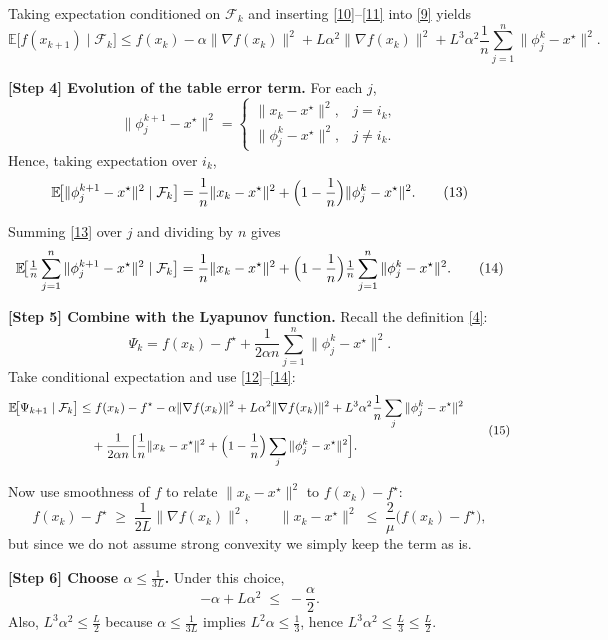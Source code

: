\documentclass{article}
\newcommand{\EE}{\mathbb{E}}
\begin{document}
Taking expectation conditioned on $\mathcal{F}_k$ and inserting \eqref{10}–\eqref{11} into \eqref{9} yields
\[
\EE\!\bigl[f(x_{k+1})\mid\mathcal{F}_k\bigr]
\le f(x_k)-\alpha\|\nabla f(x_k)\|^{2}
   +L\alpha^{2}\|\nabla f(x_k)\|^{2}
   +L^{3}\alpha^{2}\frac1n\sum_{j=1}^{n}\|\phi_j^{k}-x^{\star}\|^{2}.
\tag{12}
\]

\noindent\textbf{[Step 4] Evolution of the table error term.}  
For each $j$,
\[
\|\phi_j^{k+1}-x^{\star}\|^{2}
=
\begin{cases}
\|x_k-x^{\star}\|^{2}, & j=i_k,\\[2mm]
\|\phi_j^{k}-x^{\star}\|^{2}, & j\neq i_k.
\end{cases}
\]
Hence, taking expectation over $i_k$,
\[
\EE\!\bigl[\|\phi_j^{k+1}-x^{\star}\|^{2}\mid\mathcal{F}_k\bigr]
=
\frac1n\|x_k-x^{\star}\|^{2}
+\Bigl(1-\frac1n\Bigr)\|\phi_j^{k}-x^{\star}\|^{2}.
\tag{13}
\]

Summing \eqref{13} over $j$ and dividing by $n$ gives
\[
\EE\!\bigl[\tfrac1n\sum_{j=1}^{n}\|\phi_j^{k+1}-x^{\star}\|^{2}\mid\mathcal{F}_k\bigr]
=
\frac1n\|x_k-x^{\star}\|^{2}
+\Bigl(1-\frac1n\Bigr)\tfrac1n\sum_{j=1}^{n}\|\phi_j^{k}-x^{\star}\|^{2}.
\tag{14}
\]

\noindent\textbf{[Step 5] Combine with the Lyapunov function.}  
Recall the definition \eqref{4}:
\[
\Psi_{k}=f(x_k)-f^{\star}+\frac{1}{2\alpha n}\sum_{j=1}^{n}\|\phi_j^{k}-x^{\star}\|^{2}.
\]
Take conditional expectation and use \eqref{12}–\eqref{14}:
\[
\begin{aligned}
\EE\!\bigl[\Psi_{k+1}\mid\mathcal{F}_k\bigr]
&\le f(x_k)-f^{\star}
   -\alpha\|\nabla f(x_k)\|^{2}
   +L\alpha^{2}\|\nabla f(x_k)\|^{2}
   +L^{3}\alpha^{2}\frac1n\sum_{j}\|\phi_j^{k}-x^{\star}\|^{2}\\
&\quad+\frac{1}{2\alpha n}\Bigl[
      \frac1n\|x_k-x^{\star}\|^{2}
      +\Bigl(1-\frac1n\Bigr)\sum_{j}\|\phi_j^{k}-x^{\star}\|^{2}
   \Bigr].
\end{aligned}
\tag{15}
\]

Now use smoothness of $f$ to relate $\|x_k-x^{\star}\|^{2}$ to $f(x_k)-f^{\star}$:
\[
f(x_k)-f^{\star}\;\ge\;\frac{1}{2L}\|\nabla f(x_k)\|^{2},
\qquad
\|x_k-x^{\star}\|^{2}\;\le\;\frac{2}{\mu}\bigl(f(x_k)-f^{\star}\bigr),
\]
but since we do not assume strong convexity we simply keep the term as is.

\noindent\textbf{[Step 6] Choose $\alpha\le \frac{1}{3L}$.}  
Under this choice,
\[
-\alpha + L\alpha^{2}\;\le\; -\frac{\alpha}{2}.
\tag{16}
\]
Also, $L^{3}\alpha^{2}\le \frac{L}{2}$ because $\alpha\le\frac{1}{3L}$ implies $L^{2}\alpha\le \frac13$, hence $L^{3}\alpha^{2}\le \frac{L}{3}\le\frac{L}{2}$.
\end{document}
